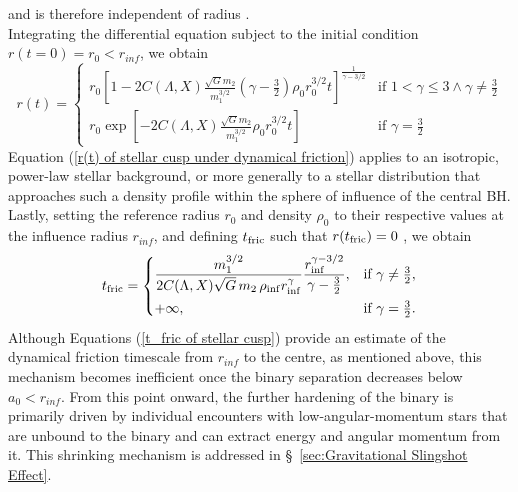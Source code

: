 \documentclass[12pt,twoside,openany]{book}
\begin{document}
and is therefore independent of radius \parencite{Madigan_2011}.\\Integrating the differential equation subject to the initial condition $r(t=0)=r_0<r_{inf}$, we obtain
\begin{equation}\label{r(t) of stellar cusp under dynamical friction}
r(t)=
\begin{cases}
r_0\left[1-2C(\Lambda,X)\frac{\sqrt{G}m_2}{m_1^{3/2}}\left(\gamma-\frac{3}{2}\right)\rho_0r_0^{3/2}t\right]^{\frac{1}{\gamma-3/2}}
& \text{if } 1<\gamma\le 3 \land \gamma \ne \frac{3}{2} \\[6pt]
r_0\exp\left[-2C(\Lambda,X)\frac{\sqrt{G}m_2}{m_1^{3/2}}\rho_0r_0^{3/2}t\right]
& \text{if } \gamma = \frac{3}{2}
\end{cases}
\end{equation}
Equation (\ref{r(t) of stellar cusp under dynamical friction}) applies to an isotropic, power-law stellar background, or more generally to a stellar distribution that approaches such a density profile within the sphere of influence of the central BH.\\Lastly, setting the reference radius $r_0$ and density $\rho_0$ to their respective values at the influence radius $r_{inf}$, and defining $t_{\rm fric}$ such that $r(t_{\rm fric})=0$ \parencite{Baumgardt_2006}, we obtain
\begin{equation}\label{t_fric of stellar cusp}
t_{\rm fric}=
\begin{cases}
\displaystyle
\frac{m_1^{3/2}}
{2C(\Lambda,X)\sqrt{G}\,m_2\,\rho_{\rm inf}r_{\rm inf}^{\gamma}}
\frac{r_{\rm inf}^{\gamma-3/2}}
{\gamma-\frac{3}{2}},
& \text{if } \gamma\neq\frac{3}{2}, \\[10pt]
\displaystyle
+\infty,
& \text{if } \gamma=\frac{3}{2}.
\end{cases}
\end{equation}
Although Equations (\ref{t_fric of stellar cusp}) provide an estimate of the dynamical friction timescale from $r_{inf}$ to the centre, as mentioned above, this mechanism becomes inefficient once the binary separation decreases below $a_0<r_{inf}$. From this point onward, the further hardening of the binary is primarily driven by individual encounters with low-angular-momentum stars that are unbound to the binary and can extract energy and angular momentum from it. This shrinking mechanism is addressed in \S~\ref{sec:Gravitational Slingshot Effect}.
\end{document}
